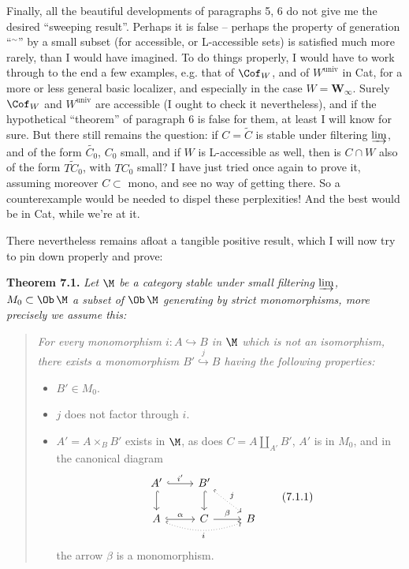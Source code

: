 Finally, all the beautiful developments of paragraphs 5, 6 do not give me the desired ``sweeping result''. Perhaps it is false -- perhaps the property of generation
``$^{\sim}$'' by a small subset (for accessible, or L-accessible sets) is satisfied much more rarely, than I would have imagined. To do things properly, I would have to work through to the %
end a few examples, e.g. that of $\Cof_W$, and of $W^{\mathrm{univ}}$ in Cat, for a more or less general basic localizer, and especially in the case $W = \mathbf{W}_{\infty}$. Surely $\Cof_W$ and $W^{\mathrm{univ}}$ are accessible (I ought to check it nevertheless), and if the hypothetical ``theorem'' of paragraph 6 is false for them, at least I will know for sure. But there still remains the question: if $C = \widetilde{C}$ is stable under filtering $\varinjlim$, and of the form $\widetilde{C_0}$, $C_0$ small, and if $W$ is L-accessible as well, then is $C \cap W$ also of the form $\widetilde{TC_0}$, with $TC_0$ small? I have just tried once again to prove it, assuming moreover $C \subset$ mono, and see no way of getting there. So a counterexample would be needed to dispel these perplexities! And the best would be in Cat, while we're at it.

There nevertheless remains afloat a tangible positive result, which I will now try to pin down properly and prove:

\textbf{Theorem 7.1.} \textit{Let $\M$ be a category stable under small filtering $\varinjlim$, $M_0 \subset \Ob\,\M$ a subset of} $\Ob\,\M$ \textit{generating by strict monomorphisms, more precisely we assume this:}

\begin{quote}
\itshape
For every monomorphism $i : A \hookrightarrow B$ in $\M$ which is not an isomorphism, there exists a monomorphism $B' \overset{j}{\hookrightarrow} B$ having the following properties:
\begin{itemize}
\item[\textup{a)}] $B' \in M_0$.
\item[\textup{b)}] $j$ does not factor through $i$.
\item[\textup{c)}] $A' = A \times_B B'$ exists in $\M$, as does $C = A \amalg_{A'} B'$, $A'$ is in $M_0$, and in the canonical diagram
\[
\begin{tikzcd}
A' \arrow[r, hook, "i'"] \arrow[d, hook] & B' \arrow[d, hook] \arrow[dr, hook, dotted, "j"] & \\
A \arrow[r, hook, "\alpha"] \arrow[rr, hook, dotted, bend right=20, "i"'] & C \arrow[r, "\beta"] & B
\end{tikzcd}
\tag*{(7.1.1)}
\]
the arrow $\beta$ is a monomorphism.
\end{itemize}
\end{quote}

